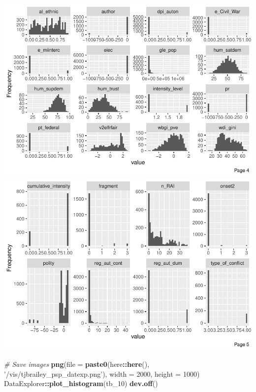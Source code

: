 \documentclass[
]{article}
\newenvironment{Shaded}{\begin{snugshade}}{\end{snugshade}}
\newcommand{\CommentTok}[1]{\textcolor[rgb]{0.56,0.35,0.01}{\textit{#1}}}
\newcommand{\DataTypeTok}[1]{\textcolor[rgb]{0.13,0.29,0.53}{#1}}
\newcommand{\DecValTok}[1]{\textcolor[rgb]{0.00,0.00,0.81}{#1}}
\newcommand{\KeywordTok}[1]{\textcolor[rgb]{0.13,0.29,0.53}{\textbf{#1}}}
\newcommand{\NormalTok}[1]{#1}
\newcommand{\OperatorTok}[1]{\textcolor[rgb]{0.81,0.36,0.00}{\textbf{#1}}}
\newcommand{\StringTok}[1]{\textcolor[rgb]{0.31,0.60,0.02}{#1}}
\begin{document}
\includegraphics{01_tjbrailey_wrangle_data_files/figure-latex/unnamed-chunk-13-4.pdf}
\includegraphics{01_tjbrailey_wrangle_data_files/figure-latex/unnamed-chunk-13-5.pdf}

\begin{Shaded}
\begin{Highlighting}[]
\CommentTok{# Save images}
\KeywordTok{png}\NormalTok{(}\DataTypeTok{file =} \KeywordTok{paste0}\NormalTok{(here}\OperatorTok{::}\KeywordTok{here}\NormalTok{(), }\StringTok{'/vis/tjbrailey_psp_datexp.png'}\NormalTok{),}
    \DataTypeTok{width =} \DecValTok{2000}\NormalTok{,}
    \DataTypeTok{height =} \DecValTok{1000}\NormalTok{)}
\NormalTok{DataExplorer}\OperatorTok{::}\KeywordTok{plot_histogram}\NormalTok{(tb_}\DecValTok{10}\NormalTok{)}
\KeywordTok{dev.off}\NormalTok{()}
\end{Highlighting}
\end{Shaded}
\end{document}

